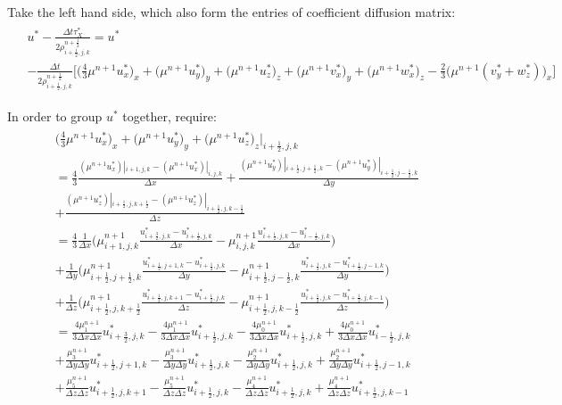 \documentclass{article}
\numberwithin{equation}{subsection}
\begin{document}
Take the left hand side, which also form the entries of coefficient diffusion matrix:
\begin{align}
\begin{split}
& u^{*} - \frac{\Delta t  \tau_X^{*}}{2\rho^{n+\frac{1}{2}}_{i+\frac{1}{2},j,k}} = u^{*} \\
& -\frac{\Delta t}{2\rho^{n+\frac{1}{2}}_{i+\frac{1}{2},j,k}} \Bigg[ \Big(\frac{4}{3}\mu^{n+1} u^*_x \Big)_x + \Big(\mu^{n+1} u^*_y\Big)_y + \Big(\mu^{n+1} u^*_z\Big)_z + \Big(\mu^{n+1} v^*_x \Big)_y + \Big(\mu^{n+1} w^*_x\Big)_z - \frac{2}{3}\Big(\mu^{n+1}(v^*_y + w^*_z)\Big)_x \Bigg]
\end{split}
\end{align}

In order to group $u^*$ together, require:
\begin{align}
\begin{split}
& \Big(\frac{4}{3}\mu^{n+1} u^*_x \Big)_x + \Big(\mu^{n+1} u^*_y\Big)_y + \Big(\mu^{n+1} u^*_z\Big)_z |_{i+\frac{1}{2},j,k} \\
& = \frac{4}{3} \frac{(\mu^{n+1} u_x^*)|_{i+1,j,k} - (\mu^{n+1} u^*_x)|_{i,j,k}}{\Delta x} + \frac{(\mu^{n+1} u^*_y)|_{i+\frac{1}{2},j+\frac{1}{2},k} - (\mu^{n+1} u^*_y)|_{i+\frac{1}{2},j-\frac{1}{2},k}}{\Delta y} \\
& + \frac{(\mu^{n+1}u^*_z)|_{i+\frac{1}{2},j,k+\frac{1}{2}} - (\mu^{n+1} u^*_{z})|_{i+\frac{1}{2},j,k-\frac{1}{2}}}{\Delta z}\\
& = \frac{4}{3} \frac{1}{\Delta x} \Big( \mu^{n+1}_{i+1,j,k} \frac{u^*_{i+\frac{3}{2},j,k} - u^*_{i+\frac{1}{2},j,k}}{\Delta x} - \mu^{n+1}_{i,j,k} \frac{u^*_{i+\frac{1}{2},j,k}-u^*_{i-\frac{1}{2},j,k}}{\Delta x} \Big) \\
& +  \frac{1}{\Delta y} \Big( \mu^{n+1}_{i+\frac{1}{2},j+\frac{1}{2},k} \frac{u^*_{i+\frac{1}{2},j+1,k} - u^*_{i+\frac{1}{2},j,k}}{\Delta y} - \mu^{n+1}_{i+\frac{1}{2},j-\frac{1}{2},k}\frac{u^*_{i+\frac{1}{2},j,k} - u^*_{i+\frac{1}{2},j-1,k}}{\Delta y} \Big) \\
& + \frac{1}{\Delta z} \Big( \mu^{n+1}_{i+\frac{1}{2},j,k+\frac{1}{2}}\frac{u^*_{i+\frac{1}{2},j,k+1} - u^*_{i+\frac{1}{2},j,k}}{\Delta z} - \mu^{n+1}_{i+\frac{1}{2},j,k-\frac{1}{2}}\frac{u^*_{i+\frac{1}{2},j,k} - u^*_{i+\frac{1}{2},j,k-1}}{\Delta z} \Big)\\
& = \frac{4\mu^{n+1}_1}{3\Delta x \Delta x}u^*_{i+\frac{3}{2},j,k} - \frac{4\mu^{n+1}_1}{3\Delta x \Delta x}u^*_{i+\frac{1}{2},j,k} - \frac{4\mu^{n+1}_0}{3\Delta x \Delta x}u^*_{i+\frac{1}{2},j,k} + \frac{4\mu^{n+1}_0}{3\Delta x \Delta x}u^*_{i-\frac{1}{2},j,k}\\
& + \frac{\mu^{n+1}_3}{\Delta y \Delta y}u^*_{i+\frac{1}{2},j+1,k} - \frac{\mu^{n+1}_3}{\Delta y \Delta y}u^*_{i+\frac{1}{2},j,k} - \frac{\mu^{n+1}_2}{\Delta y \Delta y}u^*_{i+\frac{1}{2},j,k} + \frac{\mu^{n+1}_2}{\Delta y \Delta y}u^*_{i+\frac{1}{2},j-1,k}\\
& + \frac{\mu^{n+1}_5}{\Delta z \Delta z}u^*_{i+\frac{1}{2},j,k+1} - \frac{\mu^{n+1}_5}{\Delta z \Delta z}u^*_{i+\frac{1}{2},j,k} - \frac{\mu^{n+1}_4}{\Delta z \Delta z}u^*_{i+\frac{1}{2},j,k} + \frac{\mu^{n+1}_4}{\Delta z \Delta z}u^*_{i+\frac{1}{2},j,k-1}
\end{split}
\end{align}
\end{document}
